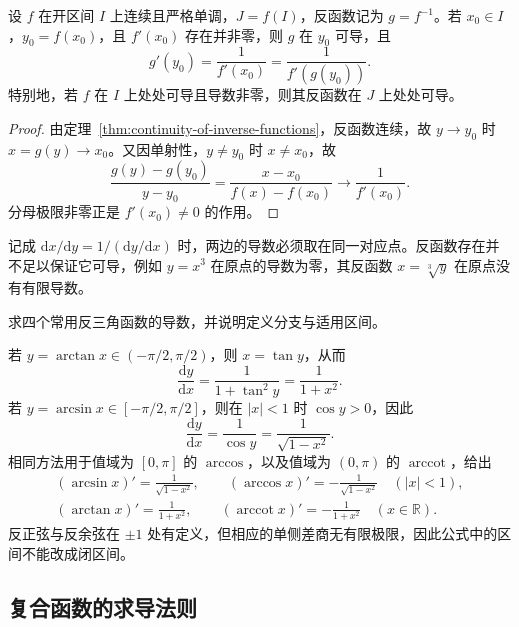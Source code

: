 \documentclass[UTF8,12pt,a4paper,fontset=fandol]{ctexbook}
\begin{document}
\begin{theorem}
\label{thm:inverse-function-derivative}
设 $f$ 在开区间 $I$ 上连续且严格单调，$J=f(I)$，反函数记为 $g=f^{-1}$。若 $x_0\in I$，$y_0=f(x_0)$，且 $f'(x_0)$ 存在并非零，则 $g$ 在 $y_0$ 可导，且
\begin{equation}
\label{eq:inverse-function-derivative}
    g'(y_0)=\frac1{f'(x_0)}=\frac1{f'(g(y_0))}.
\end{equation}
特别地，若 $f$ 在 $I$ 上处处可导且导数非零，则其反函数在 $J$ 上处处可导。
\end{theorem}
\begin{proof}
由定理~\ref{thm:continuity-of-inverse-functions}，反函数连续，故 $y\to y_0$ 时 $x=g(y)\to x_0$。又因单射性，$y\ne y_0$ 时 $x\ne x_0$，故
\[
    \frac{g(y)-g(y_0)}{y-y_0}
    =\frac{x-x_0}{f(x)-f(x_0)}
    \longrightarrow\frac1{f'(x_0)}.
\]
分母极限非零正是 $f'(x_0)\ne0$ 的作用。
\end{proof}

记成 $\mathrm dx/\mathrm dy=1/(\mathrm dy/\mathrm dx)$ 时，两边的导数必须取在同一对应点。反函数存在并不足以保证它可导，例如 $y=x^3$ 在原点的导数为零，其反函数 $x=\sqrt[3]{y}$ 在原点没有有限导数。

\begin{example}
\label{ex:derivatives-of-inverse-trigonometric-functions}
求四个常用反三角函数的导数，并说明定义分支与适用区间。
\end{example}
\begin{solve}
若 $y=\arctan x\in(-\pi/2,\pi/2)$，则 $x=\tan y$，从而
\[
    \frac{\mathrm dy}{\mathrm dx}
    =\frac1{1+\tan^2y}=\frac1{1+x^2}.
\]
若 $y=\arcsin x\in[-\pi/2,\pi/2]$，则在 $|x|<1$ 时 $\cos y>0$，因此
\[
    \frac{\mathrm dy}{\mathrm dx}
    =\frac1{\cos y}=\frac1{\sqrt{1-x^2}}.
\]
相同方法用于值域为 $[0,\pi]$ 的 $\arccos$，以及值域为 $(0,\pi)$ 的 $\operatorname{arccot}$，给出
\begin{equation}
\label{eq:inverse-trigonometric-derivatives}
\begin{gathered}
    (\arcsin x)'=\frac1{\sqrt{1-x^2}},\qquad
    (\arccos x)'=-\frac1{\sqrt{1-x^2}}\quad(|x|<1),\\
    (\arctan x)'=\frac1{1+x^2},\qquad
    (\operatorname{arccot}x)'=-\frac1{1+x^2}\quad(x\in\mathbb R).
\end{gathered}
\end{equation}
反正弦与反余弦在 $\pm1$ 处有定义，但相应的单侧差商无有限极限，因此公式中的区间不能改成闭区间。
\end{solve}

\subsection{复合函数的求导法则}
\label{subsec:chain-rule}
\end{document}
